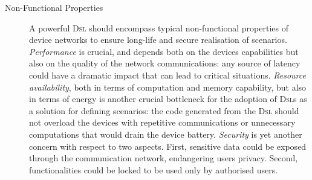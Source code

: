 \begin{description}
	\item[Non-Functional Properties] A powerful \textsc{Dsl} should encompass typical non-functional properties of device networks to ensure long-life and secure realisation of scenarios. \emph{Performance} is crucial, and depends both on the devices capabilities but also on the quality of the network communications: any source of latency could have a dramatic impact that can lead to critical situations. \emph{Resource availability}, both in terms of computation and memory capability, but also in terms of energy is another crucial bottleneck for the adoption of \textsc{Dsl}s as a solution for defining scenarios: the code generated from the \textsc{Dsl} should not overload the devices with repetitive communications or unnecessary computations that would drain the device battery. \emph{Security} is yet another concern with respect to two aspects. First, sensitive data could be exposed through the communication network, endangering users privacy. Second, functionalities could be locked to be used only by authorised users.

\end{description}

